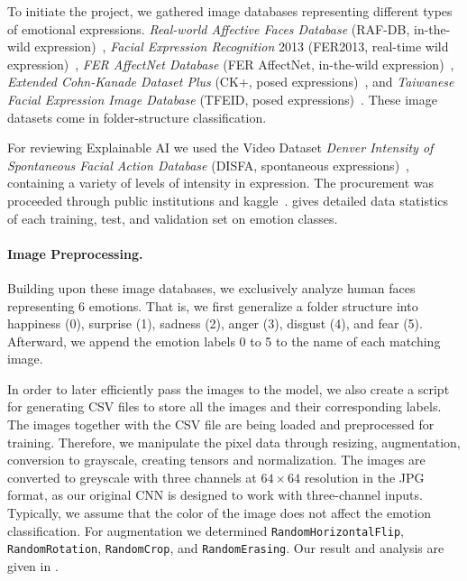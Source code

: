 To initiate the project, we gathered image databases representing different types of emotional expressions. 
\textit{Real-world Affective Faces Database} (RAF-DB, in-the-wild expression)~\cite{li_reliable_2017,li2019reliable}, 
\textit{Facial Expression Recognition} 2013 (FER2013, real-time wild expression)~\cite{BarsoumZCZ16}, 
\textit{FER AffectNet Database} (FER AffectNet, in-the-wild expression)~\cite{Mollah2019ANet}, 
\textit{Extended Cohn-Kanade Dataset Plus} (CK+, posed expressions)~\cite{LuceyCKSAM10}, 
and \textit{Taiwanese Facial Expression Image Database} (TFEID, posed expressions)~\cite{tfeid,LiGL22}.
These image datasets come in folder-structure classification.

For reviewing Explainable AI we used the Video Dataset
\textit{Denver Intensity of Spontaneous Facial Action Database} (DISFA, spontaneous expressions)~\cite{MavadatiMBTC13}, 
containing a variety of levels of intensity in expression.
The procurement was proceeded through public institutions and kaggle~\cite{kaggle_rafdb,kagaff}. 
 gives detailed data statistics of each training, test, and validation set on emotion classes.


\paragraph{Image Preprocessing.}
Building upon these image databases, we exclusively analyze human faces representing 6 emotions. 
That is, we first generalize a folder structure into happiness (0), surprise (1), sadness (2), 
anger (3), disgust (4), and fear (5).
Afterward, we append the emotion labels 0 to 5 to the name of each matching image.

In order to later efficiently pass the images to the model, 
we also create a script for generating CSV files to store all the images and their corresponding labels. 
The images together with the CSV file are being loaded and preprocessed for training. 
Therefore, we manipulate the pixel data through resizing, 
augmentation, conversion to grayscale, creating tensors and normalization. 
The images are converted to greyscale with three channels at $64 \times 64$ resolution in the JPG format, 
as our original CNN is designed to work with three-channel inputs. 
Typically, we assume that the color of the image does not affect the emotion classification. 
For augmentation we determined \texttt{RandomHorizontalFlip}, \texttt{RandomRotation}, \texttt{RandomCrop}, and \texttt{RandomErasing}. 
Our result and analysis are given in . 

